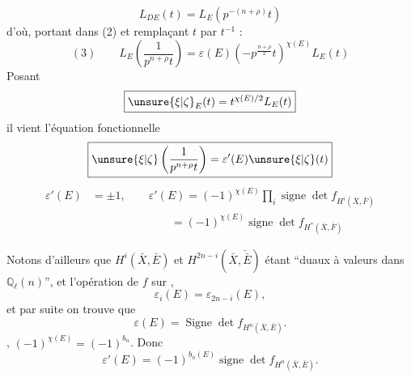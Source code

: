 \[L_{DE}(t)=L_E\left(p^{-(n+\rho)}t\right)\]
d'où, portant dans (2) et remplaçant $t$ par $t^{-1}$ :
\[
(3)\qquad\boxed{L_E\left(\frac1{p^{n+\rho}t}\right)=\varepsilon(E)\left(-p^{\frac{n+\rho}{2}}t\right)^{\chi(E)}L_E(t)}
\]
Posant
\[\boxed{\unsure{\xi|\zeta}_E(t)=t^{\chi(E)/2}L_E(t)}\]
il vient l'équation fonctionnelle
\[\boxed{\unsure{\xi|\zeta}\left(\frac1{p^{n+\rho}t}\right)=\varepsilon'(E)\unsure{\xi|\zeta}(t)}\]
\[
\begin{aligned}
\varepsilon'(E)&=\pm1,\qquad\varepsilon'(E)=(-1)^{\chi(E)}\prod_i\operatorname{signe}\det f_{H^i(\bar X,\bar F)}\\
&\hspace{7em}=(-1)^{\chi(E)}\operatorname{signe}\det f_{H^*(\bar X,\bar F)}
\end{aligned}
\]

Notons d'ailleurs que $H^i(\bar X,\bar E)$ et $H^{2n-i}(\bar X,\check{\bar E})$  étant ``duaux à valeurs dans $\mathbb Q_\ell(n)$'', et l'opération de $f$ sur  ,
\[\varepsilon_i(E)=\varepsilon_{2n-i}(E),\]
et par suite on trouve que
\[\boxed{\varepsilon(E)=\operatorname{Signe}\det f_{H^n(\bar X,\bar E)}}.\]
, $(-1)^{\chi(E)}=(-1)^{b_n}$. Donc
\[\varepsilon'(E)=(-1)^{b_n(E)}\operatorname{signe}\det f_{H^n(\bar X,\bar E)}.\]
